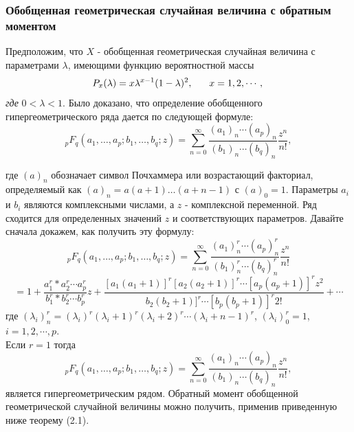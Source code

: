 \documentclass[13pt]{article}
\begin{document}
\subsubsection{Обобщенная геометрическая случайная величина с обратным моментом}\label{subsection 2.1}

Предположим, что $X$ - обобщенная геометрическая случайная величина с параметрами $\lambda$, имеющими функцию вероятностной массы
\begin{equation}
    P_{x}(\lambda) = x\lambda^{x-1}(1-\lambda)^{2}, \hspace{6 mm} x= 1,2,\cdots,\\
\end{equation}
\textit{где} $0<\lambda<1$. 
Было доказано, что определение обобщенного гипергеометрического ряда дается по следующей формуле:
\[ {}_pF_q(a_1, \ldots, a_p; b_1, \ldots, b_q; z) = \sum_{n=0}^{\infty} \frac{(a_1)_n \cdots (a_p)_n}{(b_1)_n \cdots (b_q)_n} \frac{z^n}{n!}, \]

где \( (a)_n \) обозначает символ Почхаммера или возрастающий факториал, определяемый как \( (a)_n = a(a+1)\ldots(a+n-1) \) с \( (a)_0 = 1 \). Параметры \( a_i \) и \( b_i \) являются комплексными числами, а \( z\) - комплексной переменной. Ряд сходится для определенных значений \( z\) и соответствующих параметров. Давайте сначала докажем, как получить эту формулу:
\[ 
{}_pF_q(a_1, \ldots, a_p; b_1, \ldots, b_q; z) =  \sum_{n=0}^{\infty} \frac{(a_1)_n^{r} \cdots (a_p)_n^{r}}{(b_1)_n^{r} \cdots (b_q)_n^{r}} \frac{z^n}{n!}
\]
\[
= 1 + \frac{a_{1}^{r}*a_{2}^{r} \cdots a_{p}^{r}}{b_{1}^{r}*b_{2}^{r} \cdots b_{p}^{r}}z + \frac{[a_{1}(a_{1}+1)]^{r}[a_{2}(a_{2}+1)]^{r} \cdots [a_p(a_p + 1)]^{r}z^2}{b_{2}(b_{2}+1)]^{r} \cdots [b_p(b_p + 1)]^{r}2!} + \cdots
\]
где $(\lambda_i)_n^r = (\lambda_i)^r(\lambda_i+1)^r(\lambda_i+2)^r \cdots (\lambda_i + n - 1)^r$, $(\lambda_i)_0^r = 1$, $i = 1,2,\cdots,p.$\\
Если  $r=1$ тогда $${}_pF_q(a_1, \ldots, a_p; b_1, \ldots, b_q; z) = \sum_{n=0}^{\infty} \frac{(a_1)_n \cdots (a_p)_n}{(b_1)_n \cdots (b_q)_n} \frac{z^n}{n!},$$ является гипергеометрическим рядом. Обратный момент обобщенной геометрической случайной величины можно получить, применив приведенную ниже теорему (2.1).\\
\end{document}

